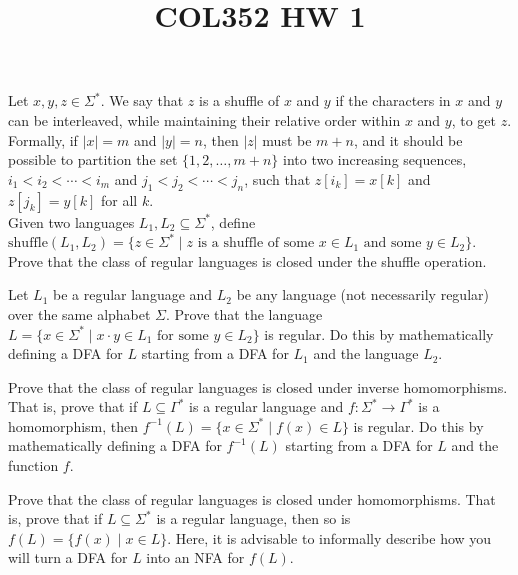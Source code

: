\documentclass[a4paper]{article}
\title{\textbf{COL352 HW 1}}
\date{}
\begin{document}
\maketitle

\begin{prob}
Let $x, y, z \in \Sigma^*$. We say that $z$ is a shuffle of $x$ and $y$ if the characters in $x$ and $y$ can be interleaved, while maintaining their relative order within $x$ and $y$, to get $z$.
Formally, if $|x| = m$ and $|y| = n$, then $|z|$ must be $m + n$, and it should be possible to partition the set $\{1, 2, \ldots, m + n\}$ into two increasing sequences, $i_1 < i_2 < \cdots < i_m$ and
$j_1 < j_2 < \cdots < j_n$, such that $z[i_k] = x[k]$ and $z[j_k] = y[k]$ for all $k$.\\

Given two languages $L_1, L_2 \subseteq \Sigma^*$, define $\mathrm{shuffle}(L_1, L_2) = \{z \in \Sigma^* \mid z \text{ is a shuffle of some } x \in L_1 \text{ and some } y \in L_2\}$.
Prove that the class of regular languages is closed under the shuffle operation.

\end{prob}




\newpage

\begin{prob}
Let $L_1$ be a regular language and $L_2$ be any language (not necessarily regular) over the same alphabet $\Sigma$.
Prove that the language $L = \{x \in \Sigma^* \mid x \cdot y \in L_1 \text{ for some } y \in L_2\}$ is regular. Do this by mathematically
defining a DFA for $L$ starting from a DFA for $L_1$ and the language $L_2$.

\end{prob}



\newpage

\begin{prob}
 Prove that the class of regular languages is closed under inverse homomorphisms. That is, prove that if
$L \subseteq \Gamma^*$ is a regular language and $f : \Sigma^* \to \Gamma^*$ is a homomorphism, then $f^{-1}(L) = \{x \in \Sigma^* \mid f(x) \in L\}$
is regular. Do this by mathematically defining a DFA for $f^{-1}(L)$ starting from a DFA for $L$ and the
function $f$.
\end{prob}



\newpage
\begin{prob}
 Prove that the class of regular languages is closed under homomorphisms. That is, prove that if $L \subseteq \Sigma^*$
is a regular language, then so is $f(L) = \{f(x) \mid x \in L\}$. Here, it is advisable to informally describe how
you will turn a DFA for $L$ into an NFA for $f(L)$.
\end{prob}

\end{document}
